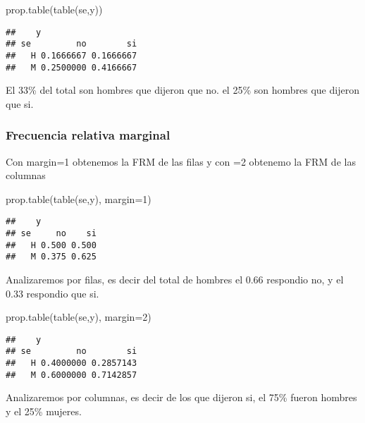 \documentclass[
]{article}
\newenvironment{Shaded}{\begin{snugshade}}{\end{snugshade}}
\newcommand{\AttributeTok}[1]{\textcolor[rgb]{0.77,0.63,0.00}{#1}}
\newcommand{\DecValTok}[1]{\textcolor[rgb]{0.00,0.00,0.81}{#1}}
\newcommand{\FunctionTok}[1]{\textcolor[rgb]{0.00,0.00,0.00}{#1}}
\newcommand{\NormalTok}[1]{#1}
\begin{document}
\begin{Shaded}
\begin{Highlighting}[]
\FunctionTok{prop.table}\NormalTok{(}\FunctionTok{table}\NormalTok{(se,y))}
\end{Highlighting}
\end{Shaded}

\begin{verbatim}
##    y
## se         no        si
##   H 0.1666667 0.1666667
##   M 0.2500000 0.4166667
\end{verbatim}

El 33\% del total son hombres que dijeron que no. el 25\% son hombres
que dijeron que si.

\hypertarget{frecuencia-relativa-marginal}{%
\subsubsection{Frecuencia relativa
marginal}\label{frecuencia-relativa-marginal}}

Con margin=1 obtenemos la FRM de las filas y con =2 obtenemo la FRM de
las columnas

\begin{Shaded}
\begin{Highlighting}[]
\FunctionTok{prop.table}\NormalTok{(}\FunctionTok{table}\NormalTok{(se,y), }\AttributeTok{margin=}\DecValTok{1}\NormalTok{)}
\end{Highlighting}
\end{Shaded}

\begin{verbatim}
##    y
## se     no    si
##   H 0.500 0.500
##   M 0.375 0.625
\end{verbatim}

Analizaremos por filas, es decir del total de hombres el 0.66 respondio
no, y el 0.33 respondio que si.

\begin{Shaded}
\begin{Highlighting}[]
\FunctionTok{prop.table}\NormalTok{(}\FunctionTok{table}\NormalTok{(se,y), }\AttributeTok{margin=}\DecValTok{2}\NormalTok{)}
\end{Highlighting}
\end{Shaded}

\begin{verbatim}
##    y
## se         no        si
##   H 0.4000000 0.2857143
##   M 0.6000000 0.7142857
\end{verbatim}

Analizaremos por columnas, es decir de los que dijeron si, el 75\%
fueron hombres y el 25\% mujeres.
\end{document}
